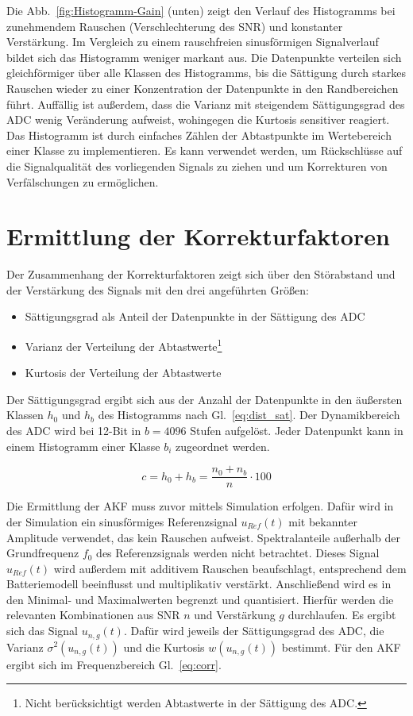 Die Abb.~\ref{fig:Histogramm-Gain} (unten) zeigt den Verlauf des Histogramms bei zunehmendem Rauschen (Verschlechterung des SNR) und konstanter Verstärkung. Im Vergleich zu einem rauschfreien sinusförmigen Signalverlauf bildet sich das Histogramm weniger markant aus. Die Datenpunkte verteilen sich gleichförmiger über alle Klassen des Histogramms, bis die Sättigung durch starkes Rauschen wieder zu einer Konzentration der Datenpunkte in den Randbereichen führt. Auffällig ist außerdem, dass die Varianz mit steigendem Sättigungsgrad des ADC wenig Veränderung aufweist, wohingegen die Kurtosis sensitiver reagiert. Das Histogramm ist durch einfaches Zählen der Abtastpunkte im Wertebereich einer Klasse zu implementieren. Es kann verwendet werden, um Rückschlüsse auf die Signalqualität des vorliegenden Signals zu ziehen und um Korrekturen von Verfälschungen zu ermöglichen. 


\section{Ermittlung der Korrekturfaktoren}
Der Zusammenhang der Korrekturfaktoren zeigt sich über den Störabstand und der Verstärkung des Signals mit den drei angeführten Größen: 
\begin{itemize}
	\item Sättigungsgrad als Anteil der Datenpunkte in der Sättigung des ADC
	\item Varianz der Verteilung der Abtastwerte\footnote[1]{Nicht berücksichtigt werden Abtastwerte in der Sättigung des ADC.\label{foot:bereinigt}}
	\item Kurtosis der Verteilung der Abtastwerte
\end{itemize}

Der Sättigungsgrad ergibt sich aus der Anzahl der Datenpunkte in den äußersten Klassen $h_0$ und $h_b$ des Histogramms nach Gl.~\eqref{eq:dist_sat}. Der Dynamikbereich des ADC wird bei 12-Bit in $b=4096$ Stufen aufgelöst. Jeder Datenpunkt kann in einem Histogramm einer Klasse $b_i$ zugeordnet werden.

\begin{equation}
	\label{eq:dist_sat}
	c = h_0 + h_b = \frac{n_0 + n_b}{n} \cdot 100
\end{equation}

Die Ermittlung der AKF muss zuvor mittels Simulation erfolgen. 
Dafür wird in der Simulation ein sinusförmiges Referenzsignal $u_{Ref}(t)$ mit bekannter Amplitude verwendet, das kein Rauschen aufweist. Spektralanteile außerhalb der Grundfrequenz $f_0$ des Referenzsignals werden nicht betrachtet. 
Dieses Signal $u_{Ref}(t)$ wird außerdem mit additivem Rauschen beaufschlagt, entsprechend dem Batteriemodell beeinflusst und multiplikativ verstärkt. Anschließend wird es in den Minimal- und Maximalwerten begrenzt und quantisiert. Hierfür werden die relevanten Kombinationen aus SNR $n$ und Verstärkung $g$ durchlaufen. Es ergibt sich das Signal $u_{n,g}(t)$. Dafür wird jeweils der Sättigungsgrad des ADC, die Varianz $\sigma^2(u_{n,g}(t))$ und die Kurtosis $w(u_{n,g}(t))$ bestimmt.
Für den AKF ergibt sich im Frequenzbereich Gl.~\eqref{eq:corr}.

